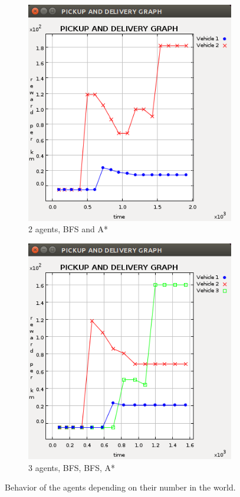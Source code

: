 \documentclass[11pt]{article}
\begin{document}
\begin{figure}
\begin{subfigure}[b]{0.3\textwidth}
    \includegraphics[width=\textwidth]{2agentsBFSASTAR.png}
    \caption{2 agents, BFS and A*}
    \label{img:2agents}
  \end{subfigure}
  \begin{subfigure}[b]{0.3\textwidth}
    \includegraphics[width=\textwidth]{3agentsBBA.png}
    \caption{3 agents, BFS, BFS, A*}
    \label{img:3agents}
  \end{subfigure}
  \caption{Behavior of the agents depending on their number in the world.}
  \label{img:multipleAgent}
\end{figure}
\end{document}
